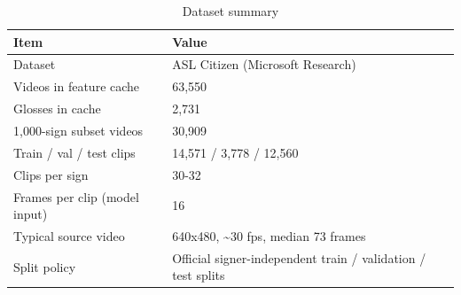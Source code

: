 \begin{table}[htbp]
\caption{Dataset summary}
\label{tab:table04_dataset_summary}
\begin{tabular}{ll}
\toprule
Item & Value \\
\midrule
Dataset & ASL Citizen (Microsoft Research) \\
Videos in feature cache & 63,550 \\
Glosses in cache & 2,731 \\
1,000-sign subset videos & 30,909 \\
Train / val / test clips & 14,571 / 3,778 / 12,560 \\
Clips per sign & 30-32 \\
Frames per clip (model input) & 16 \\
Typical source video & 640x480, \textasciitilde 30 fps, median 73 frames \\
Split policy & Official signer-independent train / validation / test splits \\
\bottomrule
\end{tabular}
\end{table}
